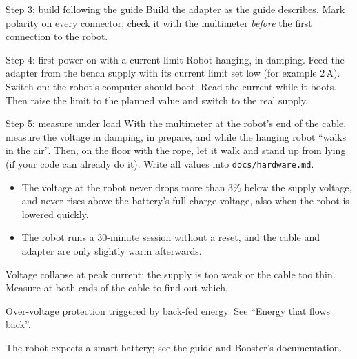 \begin{stepbox}{Step 3: build following the guide}
Build the adapter as the guide describes. Mark polarity on every connector; check it with the multimeter \emph{before} the first connection to the robot.
\end{stepbox}

\begin{stepbox}{Step 4: first power-on with a current limit}
Robot hanging, in damping. Feed the adapter from the bench supply with its current limit set low (for example $2$\,A). Switch on: the robot's computer should boot. Read the current while it boots. Then raise the limit to the planned value and switch to the real supply.
\end{stepbox}

\begin{stepbox}{Step 5: measure under load}
With the multimeter at the robot's end of the cable, measure the voltage in damping, in prepare, and while the hanging robot ``walks in the air''. Then, on the floor with the rope, let it walk and stand up from lying (if your code can already do it). Write all values into \texttt{docs/hardware.md}.
\end{stepbox}

\begin{checkbox}
\begin{itemize}[nosep]
  \item The voltage at the robot never drops more than $3\%$ below the supply voltage, and never rises above the battery's full-charge voltage, also when the robot is lowered quickly.
  \item The robot runs a $30$-minute session without a reset, and the cable and adapter are only slightly warm afterwards.
\end{itemize}
\end{checkbox}

\begin{troublebox}
\begin{description}[leftmargin=0.6cm,nosep]
  \item[The computer resets when the robot stands up] Voltage collapse at peak current: the supply is too weak or the cable too thin. Measure at both ends of the cable to find out which.
  \item[The supply switches off when the robot sits down] Over-voltage protection triggered by back-fed energy. See ``Energy that flows back''.
  \item[The robot reports a battery error] The robot expects a smart battery; see the guide and Booster's documentation.
\end{description}
\end{troublebox}

